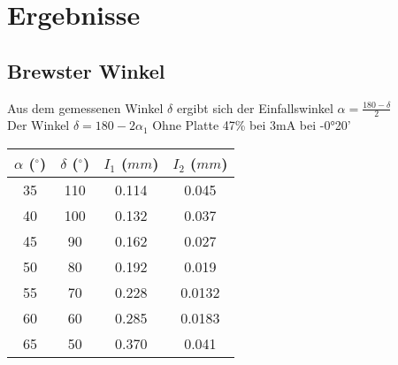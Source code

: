 \documentclass[twoside]{article}
\begin{document}
\section{Ergebnisse}
\subsection{Brewster Winkel}
Aus dem gemessenen Winkel $\delta$ ergibt sich der Einfallswinkel $\alpha=\frac{180-\delta}{2}$\\
Der Winkel $\delta=180-2\alpha_1$
Ohne Platte 47\% bei 3mA bei -0°20'

\begin{table}[H]
\begin{center}
\begin{tabular}{|c|c|c|c|}
\hline
$\alpha$ ($^\circ$) & $\delta$ ($^\circ$) & $I_1$ ($mm$) & $I_2$ ($mm$)\\
\hline
35 & 110 & 0.114 & 0.045\\
40 & 100 & 0.132 & 0.037\\
45 & 90 & 0.162 & 0.027\\
50 & 80 & 0.192 & 0.019\\
55 & 70 & 0.228 & 0.0132\\
60 & 60 & 0.285 & 0.0183\\
65 & 50 & 0.370 & 0.041\\
\hline
\end{tabular}
\end{center}
\end{table}

\end{document}
